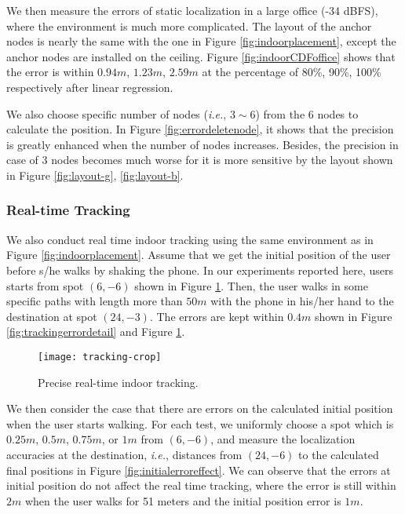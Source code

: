 \documentclass[]{sig-alternate-10pt}
\def\ie{\textit{i.e.}\xspace}
\begin{document}
We then measure the errors of static localization
 in a large office (-34 dBFS), where the
 environment is much more complicated. 
The layout of the anchor nodes is nearly the same with the one in Figure
 \ref{fig:indoorplacement}, except the anchor nodes are installed on
 the ceiling. Figure \ref{fig:indoorCDFoffice} shows that the
 error is within $0.94m$, $1.23m$, $2.59m$ at the percentage of 80\%,
 90\%, 100\% respectively after linear regression.

 We also choose specific number of nodes (\ie, $3\sim 6$) from the
 6 nodes to calculate the position. In Figure
 \ref{fig:errordeletenode}, it shows that the precision is greatly
 enhanced when the number of nodes increases. Besides, the precision in
 case of 3 nodes becomes much worse for it is more sensitive by
 the layout shown in Figure  \ref{fig:layout-g},  \ref{fig:layout-b}.




\subsubsection{Real-time Tracking}

We also conduct  real time indoor tracking using the same environment
as in Figure \ref{fig:indoorplacement}.
Assume that we  get the initial position of the user before s/he walks
by  shaking the phone.
In our experiments reported here, users starts from spot
$(6,-6)$ shown in Figure \ref{fig:realtime}. Then, the user
walks in some specific paths with length more than $50m$ with the
phone in his/her hand to the destination at spot $(24,-3)$. The errors are kept within $0.4m$ shown in Figure \ref{fig:trackingerrordetail} and Figure \ref{fig:realtime}.

\begin{figure}[ht]
    \begin{center}
        \texttt{[image: tracking-crop]}
    \end{center}
    \caption{Precise real-time indoor tracking.}
    \label{fig:realtime}
\end{figure}


We then consider the case that there are errors on the calculated initial
 position when the user starts walking.
For each test, we uniformly choose a spot which is $0.25m$,
 $0.5m$, $0.75m$, or $1m$ from $(6,-6)$, and
 measure the localization accuracies at the destination,
 \ie, distances from $(24,-6)$ to the calculated
 final positions in Figure \ref{fig:initialerroreffect}. We can observe that the errors at initial position do not affect the real
 time tracking, where the error is still within $2m$ when the user
 walks for 51 meters and the initial position error is $1m$.
\end{document}
